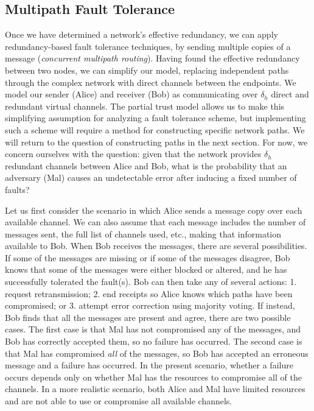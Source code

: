 \documentclass{sig-alternate-05-2015}
\begin{document}
\subsection{Multipath Fault Tolerance}

Once we have determined a network's effective redundancy,
we can apply redundancy-based fault tolerance techniques,
by sending multiple copies of a message
({\em concurrent multipath routing}).
Having found the effective redundancy between two nodes,
we can simplify our model, replacing independent paths through the
complex network with direct channels between the endpoints.
We model our sender (Alice) and receiver (Bob) as
communicating over $\delta_h$ direct and redundant virtual channels.
The partial trust model allows us to make this simplifying assumption
for analyzing a fault tolerance scheme,
but implementing such a scheme will require a method for constructing
specific network paths.
We will return to the question of constructing paths in the next section.
For now, we concern ourselves with the question:
given that the network provides $\delta_h$ redundant channels between
Alice and Bob,
what is the probability that an adversary (Mal) causes an undetectable
error after inducing a fixed number of faults?

Let us first consider the scenario in which
Alice sends a message copy over each available channel.
We can also assume that each message includes the number of messages sent,
the full list of channels used, etc.,
making that information available to Bob.
When Bob receives the messages, there are several possibilities.
If some of the messages are missing
or if some of the messages disagree,
Bob knows that some of the messages were either blocked or altered,
and he has successfully tolerated the fault(s).
Bob can then take any of several actions:
1. request retransmission;
2. end receipts so Alice knows which paths have been compromised;
or 3. attempt error correction using majority voting.
If instead, Bob finds that all the messages are present and agree,
there are two possible cases.
The first case is that Mal has not compromised any of the messages,
and Bob has correctly accepted them, so no failure has occurred.
The second case is that Mal has compromised {\em all} of the messages,
so Bob has accepted an erroneous message and a failure has occurred.
In the present scenario,
whether a failure occurs depends only on whether Mal has the resources to
compromise all of the channels.
In a more realistic scenario,
both Alice and Mal have limited resources and are not able to use or
compromise all available channels.
\end{document}
